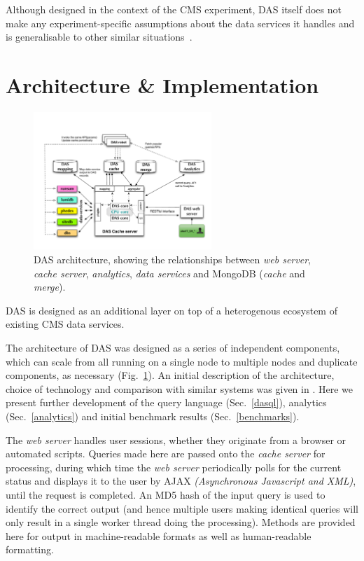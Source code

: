 \documentclass[a4paper]{jpconf}
\begin{document}
Although designed in the context of the CMS experiment, DAS itself does not make any experiment-specific assumptions about the data services it handles and is generalisable to other similar situations~\cite{drsg}.

\section{Architecture \& Implementation}

\begin{figure}
\begin{center}
\includegraphics[width=0.6\textwidth]{DAS_Cache_and_Analytics}
\end{center}
\caption{\label{dasarch}DAS architecture, showing the relationships between \emph{web server}, \emph{cache server}, \emph{analytics}, \emph{data services} and MongoDB (\emph{cache} and \emph{merge}).}
\end{figure}

DAS is designed as an additional layer on top of a heterogenous ecosystem of existing CMS data services.
 
The architecture of DAS was designed as a series of independent components, which can scale from all running on a single node to multiple nodes and duplicate components, as necessary (Fig.~\ref{dasarch}). An initial description of the architecture, choice of technology and comparison with similar systems was given in \cite{das2010}. Here we present further development of the query language (Sec.~\ref{dasql}), analytics (Sec.~\ref{analytics}) and initial benchmark results (Sec.~\ref{benchmarks}).

The \emph{web server} handles user sessions, whether they originate from a browser or automated scripts. Queries made here are passed onto the \emph{cache server} for processing, during which time the \emph{web server} periodically polls for the current status and displays it to the user by AJAX {\it (Asynchronous Javascript and XML)}, until the request is completed. An MD5 hash of the input query is used to identify the correct output (and hence multiple users making identical queries will only result in a single worker thread doing the processing). Methods are provided here for output in machine-readable formats as well as human-readable formatting.
\end{document}
